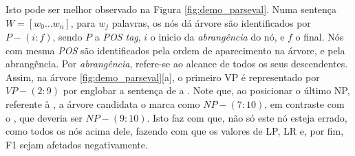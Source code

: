 Isto pode ser melhor observado na Figura \ref{fig:demo_parseval}. Numa sentença $W=[w_0 \ldots w_n]$, para $w_j$ palavras, os nós dá árvore são identificados por $P-(i:f)$, sendo $P$ a \textit{POS tag}, $i$ o inicio da \textit{abrangência} do nó, e $f$ o final. Nós com mesma \textit{POS} são identificados pela ordem de aparecimento na árvore, e pela abrangência. Por \textit{abrangência}, refere-se ao alcance de todos os seus descendentes. Assim, na árvore \ref{fig:demo_parseval}[a], o primeiro VP é representado por $VP-(2:9)$ por englobar a sentença de  a . Note que, ao posicionar o último NP, referente à , a árvore candidata o marca como $NP-(7:10)$, em contraste com o , que deveria ser $NP-(9:10)$. Isto faz com que, não só este nó esteja errado, como todos os nós acima dele, fazendo com que os valores de LP, LR e, por fim, F1 sejam afetados negativamente.